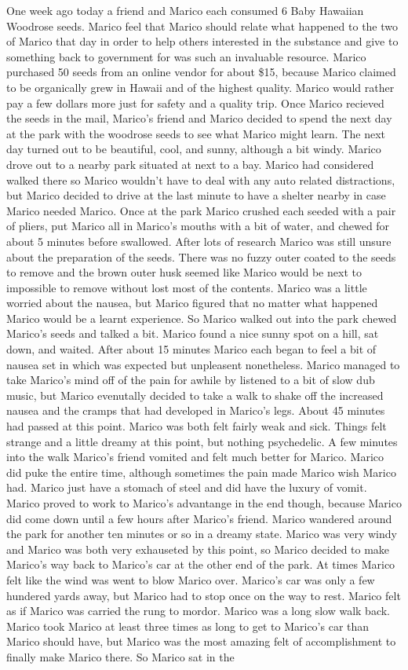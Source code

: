 \documentclass[12pt]{book}
\begin{document}
One week ago today a friend and Marico each consumed 6 Baby Hawaiian Woodrose seeds. Marico feel that Marico should relate what happened to the two of Marico that day in order to help others interested in the substance and give to something back to government for was such an invaluable resource. Marico purchased 50 seeds from an online vendor for about \$15, because Marico claimed to be organically grew in Hawaii and of the highest quality. Marico would rather pay a few dollars more just for safety and a quality trip. Once Marico recieved the seeds in the mail, Marico's friend and Marico decided to spend the next day at the park with the woodrose seeds to see what Marico might learn. The next day turned out to be beautiful, cool, and sunny, although a bit windy. Marico drove out to a nearby park situated at next to a bay. Marico had considered walked there so Marico wouldn't have to deal with any auto related distractions, but Marico decided to drive at the last minute to have a shelter nearby in case Marico needed Marico. Once at the park Marico crushed each seeded with a pair of pliers, put Marico all in Marico's mouths with a bit of water, and chewed for about 5 minutes before swallowed. After lots of research Marico was still unsure about the preparation of the seeds. There was no fuzzy outer coated to the seeds to remove and the brown outer husk seemed like Marico would be next to impossible to remove without lost most of the contents. Marico was a little worried about the nausea, but Marico figured that no matter what happened Marico would be a learnt experience. So Marico walked out into the park chewed Marico's seeds and talked a bit. Marico found a nice sunny spot on a hill, sat down, and waited. After about 15 minutes Marico each began to feel a bit of nausea set in which was expected but unpleasent nonetheless. Marico managed to take Marico's mind off of the pain for awhile by listened to a bit of slow dub music, but Marico evenutally decided to take a walk to shake off the increased nausea and the cramps that had developed in Marico's legs. About 45 minutes had passed at this point. Marico was both felt fairly weak and sick. Things felt strange and a little dreamy at this point, but nothing psychedelic. A few minutes into the walk Marico's friend vomited and felt much better for Marico. Marico did puke the entire time, although sometimes the pain made Marico wish Marico had. Marico just have a stomach of steel and did have the luxury of vomit. Marico proved to work to Marico's advantange in the end though, because Marico did come down until a few hours after Marico's friend. Marico wandered around the park for another ten minutes or so in a dreamy state. Marico was very windy and Marico was both very exhauseted by this point, so Marico decided to make Marico's way back to Marico's car at the other end of the park. At times Marico felt like the wind was went to blow Marico over. Marico's car was only a few hundered yards away, but Marico had to stop once on the way to rest. Marico felt as if Marico was carried the rung to mordor. Marico was a long slow walk back. Marico took Marico at least three times as long to get to Marico's car than Marico should have, but Marico was the most amazing felt of accomplishment to finally make Marico there. So Marico sat in the 
\end{document}
